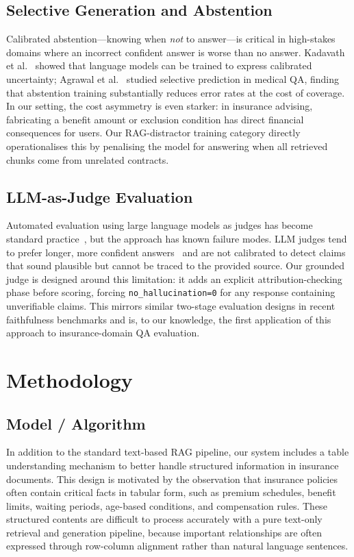 \documentclass[10pt,conference]{IEEEtran}
\begin{document}
\subsection{Selective Generation and Abstention}

Calibrated abstention---knowing when \emph{not} to answer---is critical in
high-stakes domains where an incorrect confident answer is worse than no answer.
Kadavath et al.~\cite{kadavath2022} showed that language models can be trained
to express calibrated uncertainty; Agrawal et al.~\cite{agrawal2024} studied
selective prediction in medical QA, finding that abstention training
substantially reduces error rates at the cost of coverage.
In our setting, the cost asymmetry is even starker: in insurance advising,
fabricating a benefit amount or exclusion condition has direct financial
consequences for users.
Our RAG-distractor training category directly operationalises this by
penalising the model for answering when all retrieved chunks come from
unrelated contracts.

\subsection{LLM-as-Judge Evaluation}

Automated evaluation using large language models as judges has become standard
practice~\cite{zheng2023judging}, but the approach has known failure modes.
LLM judges tend to prefer longer, more confident answers~\cite{zheng2023judging}
and are not calibrated to detect claims that sound plausible but cannot be
traced to the provided source.
Our grounded judge is designed around this limitation: it adds an explicit
attribution-checking phase before scoring, forcing \texttt{no\_hallucination=0}
for any response containing unverifiable claims.
This mirrors similar two-stage evaluation designs in recent faithfulness
benchmarks and is, to our knowledge, the first application of this approach
to insurance-domain QA evaluation.


\section{Methodology}\label{sec:method}

\subsection{Model / Algorithm}

In addition to the standard text-based RAG pipeline, our system includes a table understanding mechanism to better handle structured information in insurance documents. This design is motivated by the observation that insurance policies often contain critical facts in tabular form, such as premium schedules, benefit limits, waiting periods, age-based conditions, and compensation rules. These structured contents are difficult to process accurately with a pure text-only retrieval and generation pipeline, because important relationships are often expressed through row-column alignment rather than natural language sentences.
\leavevmode\\
\end{document}
